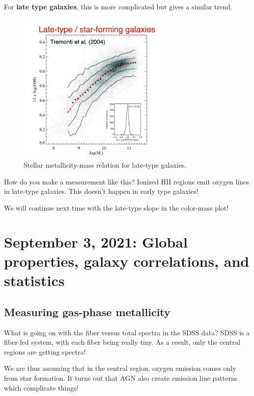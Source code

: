\documentclass{article}
\begin{document}
For \textbf{late type galaxies}, this is more complicated but gives a similar trend. 

\begin{figure}
    \centering
\includegraphics[width=0.66\textwidth]{figs/Screen Shot 2021-09-02 at 9.44.18 AM.png}
    \caption{Stellar metallicity-mass relation for late-type galaxies.}
    \label{fig:z_m_relation_late}
\end{figure}

How do you make a measurement like this? Ionized HII regions emit oxygen lines in late-type galaxies. This doesn't happen in early type galaxies! 

We will continue next time with the late-type slope in the color-mass plot! 

\section{September 3, 2021: Global properties, galaxy correlations, and statistics}

\subsection{Measuring gas-phase metallicity}

What is going on with the fiber versus total spectra in the SDSS data? SDSS is a fiber fed system, with each fiber being really tiny. As a result, only the central regions are getting spectra! 

We are thus assuming that in the central region, oxygen emission comes only from star formation. It turns out that AGN also create emission line patterns which complicate things! 
\end{document}
